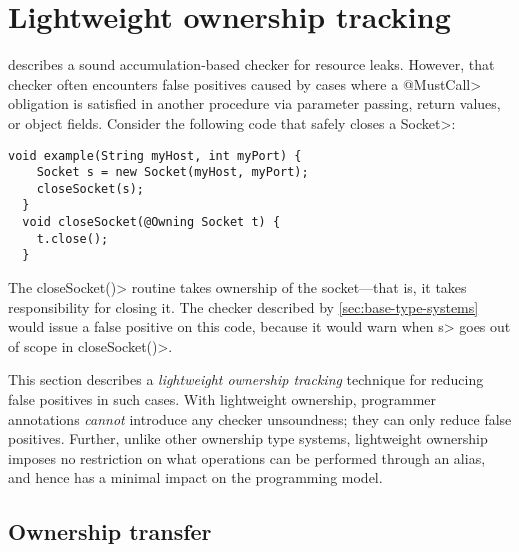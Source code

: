 \section{Lightweight ownership tracking}
\label{sec:lightweight-ownership}

 describes a sound accumulation-based
checker for resource leaks. However, that checker often encounters false
positives caused by cases where a \<@MustCall> obligation is satisfied
in another procedure via parameter passing, return values, or object fields.
Consider the following code that safely closes a \<Socket>:

\begin{lstlisting}[frame=tb,belowskip=3mm]
  void example(String myHost, int myPort) {
    Socket s = new Socket(myHost, myPort);
    closeSocket(s);
  }
  void closeSocket(@Owning Socket t) {
    t.close();
  }  
\end{lstlisting}

The \<closeSocket()> routine takes ownership of the socket---that is,
it takes responsibility for closing it. The checker described by
\cref{sec:base-type-systems} would issue a false positive on this
code, because it would warn when \<s>
goes out of scope in \<closeSocket()>.

This section describes a \emph{lightweight ownership tracking} technique for reducing
false positives in such cases.  With lightweight ownership, programmer
annotations \emph{cannot} introduce any checker unsoundness; they can only
reduce false positives.  Further, unlike other ownership type systems,
lightweight ownership imposes no restriction on what operations can be performed
through an alias, and hence has a minimal impact on the programming model.

\subsection{Ownership transfer}
\label{sec:ownership-transfer}

